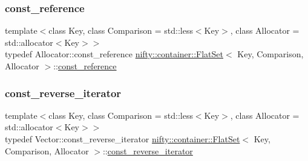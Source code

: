 \mbox{\label{classnifty_1_1container_1_1FlatSet_a9fc6932b53d6a86ec15830e31805f8d4}} 
\subsubsection{\texorpdfstring{const\+\_\+reference}{const\_reference}}
{\footnotesize\ttfamily template$<$class Key, class Comparison = std\+::less$<$\+Key$>$, class Allocator = std\+::allocator$<$\+Key$>$$>$ \\
typedef Allocator\+::const\+\_\+reference \hyperlink{classnifty_1_1container_1_1FlatSet}{nifty\+::container\+::\+Flat\+Set}$<$ Key, Comparison, Allocator $>$\+::\hyperlink{classnifty_1_1container_1_1FlatSet_a9fc6932b53d6a86ec15830e31805f8d4}{const\+\_\+reference}}

\mbox{\label{classnifty_1_1container_1_1FlatSet_ab7858d2e6eeeb311e21988d9b4a5b802}} 
\subsubsection{\texorpdfstring{const\+\_\+reverse\+\_\+iterator}{const\_reverse\_iterator}}
{\footnotesize\ttfamily template$<$class Key, class Comparison = std\+::less$<$\+Key$>$, class Allocator = std\+::allocator$<$\+Key$>$$>$ \\
typedef Vector\+::const\+\_\+reverse\+\_\+iterator \hyperlink{classnifty_1_1container_1_1FlatSet}{nifty\+::container\+::\+Flat\+Set}$<$ Key, Comparison, Allocator $>$\+::\hyperlink{classnifty_1_1container_1_1FlatSet_ab7858d2e6eeeb311e21988d9b4a5b802}{const\+\_\+reverse\+\_\+iterator}}

\mbox{\label{classnifty_1_1container_1_1FlatSet_a84e65d3e380dc5d376c9176780333700}} 
